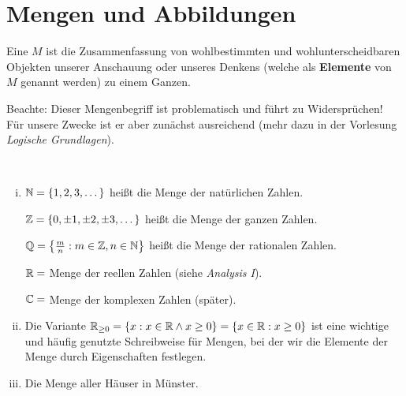 \section{Mengen und Abbildungen}
\label{sec:1.2}

\begin{definition}
	\label{def:I.2.1}
	Eine  $M$ ist die Zusammenfassung von wohlbestimmten und wohlunterscheidbaren Objekten unserer Anschauung oder unseres Denkens (welche als \textbf{Elemente} von $M$ genannt werden) zu einem Ganzen. 
\end{definition}

Beachte: Dieser Mengenbegriff ist problematisch und führt zu Widersprüchen!
Für unsere Zwecke ist er aber zunächst ausreichend (mehr dazu in der Vorlesung \textit{Logische Grundlagen}).

\begin{beispiel}
	\label{bsp:I.2.2}
	\mbox{} \\[-1.4cm]
	\begin{enumerate}[(i)]
		\item $\mathbb{N} = \{1,2,3,\dots\}$ heißt die Menge der natürlichen Zahlen.
		
		$\mathbb{Z} = \{0, \pm 1, \pm 2, \pm 3, \dots\}$ heißt die Menge der ganzen Zahlen.
		
		$\mathbb{Q} = \left\{\frac{m}{n} : m \in \mathbb{Z}, n \in \mathbb{N}\right\}$ heißt die Menge der rationalen Zahlen.
		
		$\mathbb{R} = $ Menge der reellen Zahlen (siehe \textit{Analysis I}).
		
		$\mathbb{C} = $ Menge der komplexen Zahlen (später).
		\item  Die Variante $\mathbb{R}_{\geq 0} = \{x : x \in \mathbb{R} \wedge x \geq 0\} = \{x \in \mathbb{R} : x \geq 0\}$ ist eine wichtige und häufig genutzte Schreibweise für Mengen, bei der wir die Elemente der Menge durch Eigenschaften festlegen.
		\item Die Menge aller Häuser in Münster.
	\end{enumerate}
\end{beispiel}

